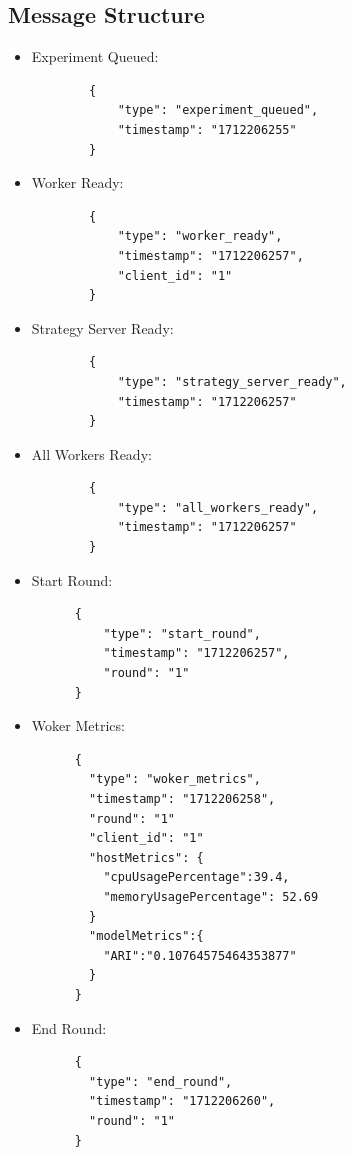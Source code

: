 \subsection{Message Structure}
\begin{itemize}
    \item Experiment Queued:
          \begin{verbatim}
        {
            "type": "experiment_queued",
            "timestamp": "1712206255"
        }
    \end{verbatim}

    \item Worker Ready:
          \begin{verbatim}
        {
            "type": "worker_ready",
            "timestamp": "1712206257",
            "client_id": "1"
        }
    \end{verbatim}

    \item Strategy Server Ready:
          \begin{verbatim}
        {
            "type": "strategy_server_ready",
            "timestamp": "1712206257"
        }
    \end{verbatim}

    \item All Workers Ready:
          \begin{verbatim}
        {
            "type": "all_workers_ready",
            "timestamp": "1712206257"
        }
    \end{verbatim}

    \item Start Round:
    \begin{verbatim}
      {
          "type": "start_round",
          "timestamp": "1712206257",
          "round": "1"
      }
    \end{verbatim}
    
     \newpage

    \item Woker Metrics:
      \begin{verbatim}
      {
        "type": "woker_metrics",
        "timestamp": "1712206258",
        "round": "1"
        "client_id": "1"
        "hostMetrics": {
          "cpuUsagePercentage":39.4,
          "memoryUsagePercentage": 52.69
        }
        "modelMetrics":{
          "ARI":"0.10764575464353877"
        }
      }
    \end{verbatim}

    \item End Round:
      \begin{verbatim}
      {
        "type": "end_round",
        "timestamp": "1712206260",
        "round": "1"
      }
    \end{verbatim}


\end{itemize}
